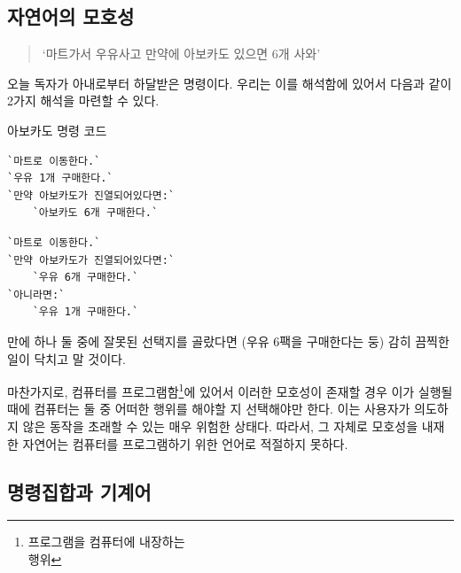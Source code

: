 \documentclass[a4paper,12pt]{book}
\begin{document}

\subsection{자연어의 모호성}

\begin{quote}
`마트가서 우유사고 만약에 아보카도 있으면 6개 사와'
\end{quote}

오늘 독자가 아내로부터 하달받은 명령이다.
우리는 이를 해석함에 있어서 다음과 같이 2가지 해석을 마련할 수 있다.

\begin{center}

    \centering

    아보카도 명령 코드

    \begin{minipage}{0.45\textwidth}
        \begin{lstlisting}[escapeinside=``]
`마트로 이동한다.`
`우유 1개 구매한다.`
`만약 아보카도가 진열되어있다면:`
    `아보카도 6개 구매한다.`
        \end{lstlisting}
    \end{minipage}
    \hfill
    \begin{minipage}{0.45\textwidth}
        \begin{lstlisting}[escapeinside=``]
`마트로 이동한다.`
`만약 아보카도가 진열되어있다면:`
    `우유 6개 구매한다.`
`아니라면:`
    `우유 1개 구매한다.`
        \end{lstlisting}
    \end{minipage}

\end{center}

만에 하나 둘 중에 잘못된 선택지를 골랐다면 (우유 6팩을 구매한다는 둥)
감히 끔찍한 일이 닥치고 말 것이다.

마찬가지로, 컴퓨터를 프로그램함\footnote{프로그램을 컴퓨터에 내장하는 \\
행위}에 있어서 이러한 모호성이 존재할 경우 이가 실행될 때에 컴퓨터는 둘
중 어떠한 행위를 해야할 지 선택해야만 한다. 이는 사용자가 의도하지 않은
동작을 초래할 수 있는 매우 위험한 상태다. 따라서, 그 자체로 모호성을
내재한 자연어는 컴퓨터를 프로그램하기 위한 언어로 적절하지 못하다.


\subsection{명령집합과 기계어}
\end{document}
